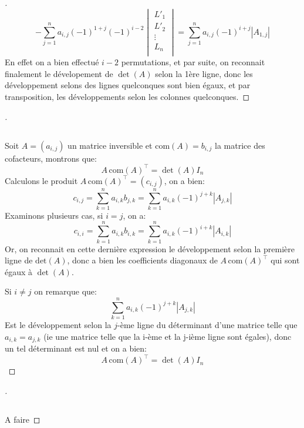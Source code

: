\documentclass{report}
\begin{document}
\begin{proof}[\unskip\nopunct]
      \[
         - \sum_{j=1}^{n} a_{i, j} (-1)^{1 + j} (-1)^{i - 2} \begin{vmatrix}
            L'_1\\
            L'_2\\
            \vdots\\
            L_n\\
         \end{vmatrix} = \sum_{j=1}^{n} a_{i, j} (-1)^{i + j} \left|A_{1, j}\right|
      \]
      En effet on a bien effectué \(i - 2\) permutations, et par suite, on reconnait finalement le dévelopement de \(\det(A)\) selon la 1ère ligne, donc les développement selons des lignes quelconques sont bien égaux, et par transposition, les développements selon les colonnes quelconques.
   \end{proof}

   \begin{proof}[\unskip\nopunct]
      \subsection*{}
      Soit \(A = (a_{i, j})\) un matrice inversible et \(\text{com}(A) = b_{i, j}\) la matrice des cofacteurs, montrons que:
      \[
         A\,\text{com}(A)^{\top} = \det(A)I_n   
      \]
      Calculons le produit \(A\,\text{com}(A)^{\top} = (c_{i, j})\), on a bien:
      \[
         c_{i, j} = \sum_{k=1}^{n} a_{i, k}b_{j, k} = \sum_{k=1}^{n} a_{i, k}(-1)^{j+k} \left| A_{j, k} \right|  
      \]
      Examinons plusieurs cas, si \(i = j\), on a:
      \[
         c_{i, i} = \sum_{k=1}^{n} a_{i, k}b_{i, k} = \sum_{k=1}^{n} a_{i, k}(-1)^{i+k} \left| A_{i, k} \right|  
      \]
      Or, on reconnait en cette dernière expression le développement selon la première ligne de \(\text{det}(A)\), donc a bien les coefficients diagonaux de \(A\,\text{com}(A)^{\top}\) qui sont égaux à \(\det(A)\).\<

      Si \(i \neq j\) on remarque que:
      \[
         \sum_{k=1}^{n} a_{i, k}(-1)^{j+k} \left| A_{j, k} \right|     
      \]
      Est le développement selon la \(j\)-ème ligne du déterminant d'une matrice telle que \(a_{i, k} = a_{j, k}\) (ie une matrice telle que la i-ème et la j-ième ligne sont égales), donc un tel déterminant est nul et on a bien:
      \[
         A\,\text{com}(A)^{\top} = \det(A)I_n  
      \]
   \end{proof}

   \begin{proof}[\unskip\nopunct]
      \subsection*{}
      A faire
   \end{proof}
\end{document}
